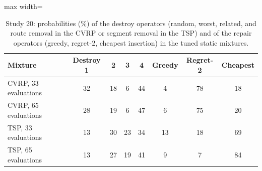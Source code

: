 \begin{table}[t]
\caption{Study 20: probabilities (\%) of the destroy operators (random, worst, related, and route removal in the CVRP or segment removal in the TSP) and of the repair operators (greedy, regret-2, cheapest insertion) in the tuned static mixtures.}\label{tab:s20w}
\centering
\small
\begin{adjustbox}{max width=\linewidth}
\begin{tabular}{lccccccc}
\toprule
Mixture & Destroy 1 & 2 & 3 & 4 & Greedy & Regret-2 & Cheapest \\
\midrule
CVRP, 33 evaluations & 32 & 18 & 6 & 44 & 4 & 78 & 18 \\
CVRP, 65 evaluations & 28 & 19 & 6 & 47 & 6 & 75 & 20 \\
TSP, 33 evaluations & 13 & 30 & 23 & 34 & 13 & 18 & 69 \\
TSP, 65 evaluations & 13 & 27 & 19 & 41 & 9 & 7 & 84 \\
\bottomrule
\end{tabular}
\end{adjustbox}
\end{table}
